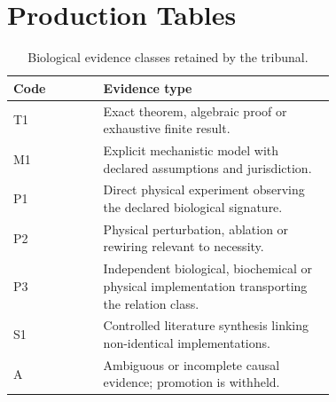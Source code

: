 \clearpage
\section*{Production Tables}

\begin{table}[htbp]
\centering
\small
\caption{Biological evidence classes retained by the tribunal.}
\label{tab:bio-evidence}
\begin{tabular}{lp{0.72\linewidth}}
\toprule
Code & Evidence type \\
\midrule
T1 & Exact theorem, algebraic proof or exhaustive finite result. \\
M1 & Explicit mechanistic model with declared assumptions and jurisdiction. \\
P1 & Direct physical experiment observing the declared biological signature. \\
P2 & Physical perturbation, ablation or rewiring relevant to necessity. \\
P3 & Independent biological, biochemical or physical implementation transporting the relation class. \\
S1 & Controlled literature synthesis linking non-identical implementations. \\
A & Ambiguous or incomplete causal evidence; promotion is withheld. \\
\bottomrule
\end{tabular}
\end{table}

